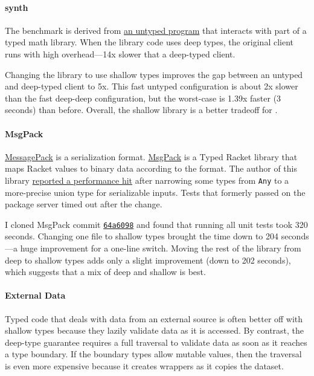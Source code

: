 \documentclass[ twoside,open=right,titlepage,numbers=noenddot,headinclude,%
                footinclude=true,cleardoublepage=empty,abstract=off,
                BCOR=5mm,paper=a4,fontsize=11pt,%
                ngerman,american,%
                parts,pdfspacing]{scrreprt}
\newcommand{\Scribtexttt}[1]{{\texttt{#1}}}
\begin{document}
\paragraph{synth}
The  benchmark is derived from \href{http://github.com/stamourv/synth}{an untyped program}
 that interacts with part of a typed math library.
When the library code uses deep types, the original client runs with
 high overhead{---}14x slower that a deep{-}typed client.

Changing the library to use shallow types improves
 the gap between an untyped and deep{-}typed client to
 5x.
This fast untyped configuration is about 2x slower than the fast
 deep{-}deep configuration, but the worst{-}case is 1.39x
 faster (3 seconds) than before.
Overall, the shallow library is a better tradeoff for .

\paragraph{MsgPack}
\href{http://msgpack.org/}{MessagePack} is a serialization format.
\href{https://gitlab.com/HiPhish/MsgPack.rkt}{MsgPack} is a Typed Racket
 library that maps Racket values to binary data according to the format.
The author of this library
 \href{https://groups.google.com/g/racket-users/c/6KQxpfMLTn0/m/lil_6qSMDAAJ}{reported a performance hit}
 after narrowing some types from \Scribtexttt{Any} to a more{-}precise union type for serializable inputs.
Tests that formerly passed on the package server timed out after the change.

I cloned MsgPack commit \href{https://github.com/HiPhish/MsgPack.rkt/commit/64a60986b149703ff9436877da1dd3e86c6e4094}{\Scribtexttt{64a6098}}
 and found that running all unit tests took 320 seconds.
Changing one file to shallow types brought the time down to 204 seconds{---}a
 huge improvement for a one{-}line switch.
Moving the rest of the library from deep to shallow types adds only a slight
 improvement (down to 202 seconds), which suggests that a mix of deep and
 shallow is best.

\paragraph{External Data}
Typed code that deals with data from an external source is often better off
 with shallow types because they lazily validate data as it is accessed.
By contrast, the deep{-}type guarantee requires a full traversal to validate
 data as soon as it reaches a type boundary.
If the boundary types allow mutable values, then the traversal is even more
 expensive because it creates wrappers as it copies the dataset.
\end{document}
